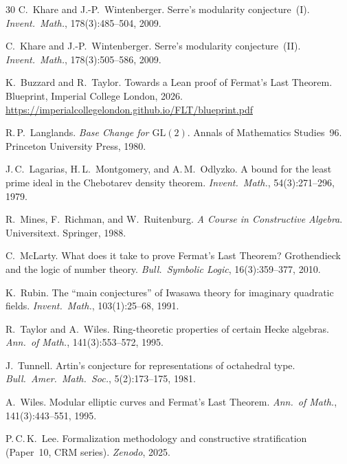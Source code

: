 \documentclass[11pt]{article}
\theoremstyle{plain}
\theoremstyle{definition}
\theoremstyle{remark}
\begin{document}
\begin{thebibliography}{30}
C.~Khare and J.-P.~Wintenberger.
\newblock Serre's modularity conjecture~(I).
\newblock \textit{Invent.\ Math.}, 178(3):485--504, 2009.

C.~Khare and J.-P.~Wintenberger.
\newblock Serre's modularity conjecture~(II).
\newblock \textit{Invent.\ Math.}, 178(3):505--586, 2009.

K.~Buzzard and R.~Taylor.
\newblock Towards a {Lean} proof of {Fermat's Last Theorem}.
\newblock Blueprint, Imperial College London, 2026.
\newblock \url{https://imperialcollegelondon.github.io/FLT/blueprint.pdf}

R.\,P.~Langlands.
\newblock \textit{Base Change for $\mathrm{GL}(2)$}.
\newblock Annals of Mathematics Studies~96.
Princeton University Press, 1980.

J.\,C.~Lagarias, H.\,L.~Montgomery, and A.\,M.~Odlyzko.
\newblock A bound for the least prime ideal in the Chebotarev
density theorem.
\newblock \textit{Invent.\ Math.}, 54(3):271--296, 1979.

R.~Mines, F.~Richman, and W.~Ruitenburg.
\newblock \textit{A Course in Constructive Algebra}.
\newblock Universitext. Springer, 1988.

C.~McLarty.
\newblock What does it take to prove Fermat's Last Theorem?
Grothendieck and the logic of number theory.
\newblock \textit{Bull.\ Symbolic Logic}, 16(3):359--377, 2010.

K.~Rubin.
\newblock The ``main conjectures'' of Iwasawa theory for imaginary
quadratic fields.
\newblock \textit{Invent.\ Math.}, 103(1):25--68, 1991.

R.~Taylor and A.~Wiles.
\newblock Ring-theoretic properties of certain Hecke algebras.
\newblock \textit{Ann.\ of Math.}, 141(3):553--572, 1995.

J.~Tunnell.
\newblock Artin's conjecture for representations of octahedral type.
\newblock \textit{Bull.\ Amer.\ Math.\ Soc.}, 5(2):173--175, 1981.

A.~Wiles.
\newblock Modular elliptic curves and Fermat's Last Theorem.
\newblock \textit{Ann.\ of Math.}, 141(3):443--551, 1995.

P.\,C.\,K.~Lee.
\newblock Formalization methodology and constructive stratification
(Paper~10, CRM series).
\newblock \textit{Zenodo}, 2025.


\end{thebibliography}
\end{document}
